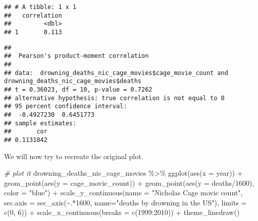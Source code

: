 \documentclass[
]{article}
\newenvironment{Shaded}{\begin{snugshade}}{\end{snugshade}}
\newcommand{\AttributeTok}[1]{\textcolor[rgb]{0.77,0.63,0.00}{#1}}
\newcommand{\CommentTok}[1]{\textcolor[rgb]{0.56,0.35,0.01}{\textit{#1}}}
\newcommand{\DecValTok}[1]{\textcolor[rgb]{0.00,0.00,0.81}{#1}}
\newcommand{\FunctionTok}[1]{\textcolor[rgb]{0.00,0.00,0.00}{#1}}
\newcommand{\NormalTok}[1]{#1}
\newcommand{\SpecialCharTok}[1]{\textcolor[rgb]{0.00,0.00,0.00}{#1}}
\newcommand{\StringTok}[1]{\textcolor[rgb]{0.31,0.60,0.02}{#1}}
\begin{document}
\begin{verbatim}
## # A tibble: 1 x 1
##   correlation
##         <dbl>
## 1       0.113
\end{verbatim}

\begin{Shaded}
\end{Shaded}

\begin{verbatim}
## 
##  Pearson's product-moment correlation
## 
## data:  drowning_deaths_nic_cage_movies$cage_movie_count and drowning_deaths_nic_cage_movies$deaths
## t = 0.36023, df = 10, p-value = 0.7262
## alternative hypothesis: true correlation is not equal to 0
## 95 percent confidence interval:
##  -0.4927230  0.6451773
## sample estimates:
##       cor 
## 0.1131842
\end{verbatim}

We will now try to recreate the original plot.

\begin{Shaded}
\begin{Highlighting}[]
\CommentTok{\# plot it}
\NormalTok{drowning\_deaths\_nic\_cage\_movies }\SpecialCharTok{\%\textgreater{}\%}
  \FunctionTok{ggplot}\NormalTok{(}\FunctionTok{aes}\NormalTok{(}\AttributeTok{x =}\NormalTok{ year)) }\SpecialCharTok{+}
  \FunctionTok{geom\_point}\NormalTok{(}\FunctionTok{aes}\NormalTok{(}\AttributeTok{y =}\NormalTok{ cage\_movie\_count)) }\SpecialCharTok{+}
  \FunctionTok{geom\_point}\NormalTok{(}\FunctionTok{aes}\NormalTok{(}\AttributeTok{y =}\NormalTok{ deaths}\SpecialCharTok{/}\DecValTok{1600}\NormalTok{),}
             \AttributeTok{color =} \StringTok{"blue"}\NormalTok{) }\SpecialCharTok{+}
  \FunctionTok{scale\_y\_continuous}\NormalTok{(}\AttributeTok{name =} \StringTok{"Nicholas Cage movie count"}\NormalTok{,}
                     \AttributeTok{sec.axis =} \FunctionTok{sec\_axis}\NormalTok{(}\SpecialCharTok{\textasciitilde{}}\NormalTok{.}\SpecialCharTok{*}\DecValTok{1600}\NormalTok{, }\AttributeTok{name=}\StringTok{"deaths by drowning in the US"}\NormalTok{),}
                     \AttributeTok{limits =} \FunctionTok{c}\NormalTok{(}\DecValTok{0}\NormalTok{, }\DecValTok{6}\NormalTok{)) }\SpecialCharTok{+}
  \FunctionTok{scale\_x\_continuous}\NormalTok{(}\AttributeTok{breaks =} \FunctionTok{c}\NormalTok{(}\DecValTok{1999}\SpecialCharTok{:}\DecValTok{2010}\NormalTok{)) }\SpecialCharTok{+}
  \FunctionTok{theme\_linedraw}\NormalTok{()}
\end{Highlighting}
\end{Shaded}
\end{document}
